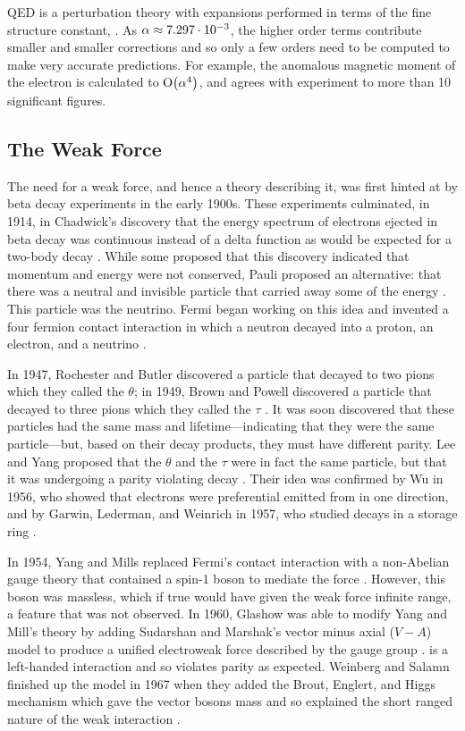 QED is a perturbation theory with expansions performed in terms of the fine
structure constant, \fsc. As $\alpha \approx 7.297 \cdot 10^{-3}$, the higher
order terms contribute smaller and smaller corrections and so only a few orders
need to be computed to make very accurate predictions. For example, the
anomalous magnetic moment of the electron is calculated to $\operatorname{O}\!\left( \alpha^{4} \right)$,
and agrees with experiment to more than \num{10} significant figures.

\subsection{The Weak Force}
\label{subsection:weak_force}

The need for a weak force, and hence a theory describing it, was first hinted
at by beta decay experiments in the early 1900s. These experiments culminated,
in 1914, in Chadwick's discovery that the energy spectrum of electrons ejected
in beta decay was continuous instead of a delta function as would be expected
for a two-body decay \cite{chadwick1914}. While some proposed that this
discovery indicated that momentum and energy were not conserved, Pauli proposed
an alternative: that there was a neutral and invisible particle that carried
away some of the energy \cite{pauli1930}. This particle was the neutrino. Fermi
began working on this idea and invented a four fermion contact interaction in
which a neutron decayed into a proton, an electron, and a neutrino
\cite{fermi1934}.

In 1947, Rochester and Butler discovered a particle that decayed to two pions
which they called the $\theta$; in 1949, Brown and Powell discovered a particle
that decayed to three pions which they called the $\tau$
\cite{Rochester1947,brown1949}. It was soon discovered that these particles had
the same mass and lifetime---indicating that they were the same particle---but,
based on their decay products, they must have different parity. Lee and Yang
proposed that the $\theta$ and the $\tau$ were in fact the same particle, but
that it was undergoing a parity violating decay \cite{lee1956}. Their idea was
confirmed by Wu in 1956, who showed that electrons were preferential emitted
from \cobaltsixty in one direction, and by Garwin, Lederman, and Weinrich in
1957, who studied \pitomunu decays in a storage ring \cite{wu1956,garwin1957}.

In 1954, Yang and Mills replaced Fermi's contact interaction with a non-Abelian
gauge theory that contained a spin-1 boson to mediate the force
\cite{yang1954}. However, this boson was massless, which if true would have
given the weak force infinite range, a feature that was not observed. In 1960,
Glashow was able to modify Yang and Mill's theory by adding Sudarshan and
Marshak's vector minus axial ($V-A$) model to produce a unified electroweak
force described by the \SUtwoUone gauge group \cite{glashow1961,sudarshan1958}.
\SUtwo is a left-handed interaction and so violates parity as expected.
Weinberg and Salamn finished up the model in 1967 when they added the Brout,
Englert, and Higgs mechanism which gave the vector bosons mass and so explained
the short ranged nature of the weak interaction
\cite{weinberg1967,salam1968,englert1964,higgs1964}.


